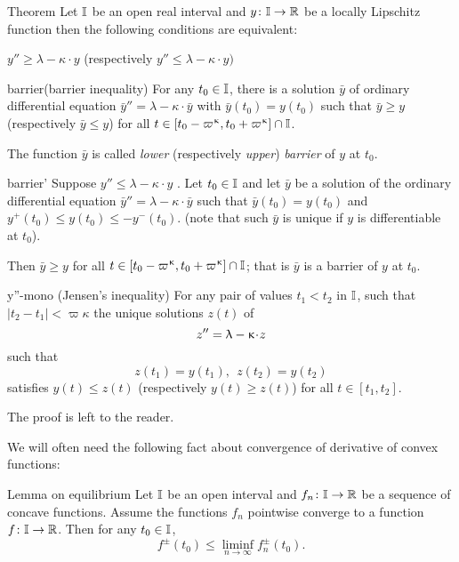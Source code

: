 \begin{thm}{Theorem}\label{y''=<1-ky}
Let $\mathbb{I}$ be an open real interval and $y\:\II\to\RR$ be a locally Lipschitz function
then the following conditions are equivalent:
\begin{subthm}{}$y''\ge \lambda-\kappa\cdot  y$ (respectively $y''\le \lambda-\kappa\cdot  y)$
\end{subthm}

\begin{subthm}{barrier}(barrier inequality) For any $t_0\in \II$, 
there is a solution $\bar y$ 
of ordinary differential equation $\bar y''=\lambda-\kappa\cdot  \bar y$ 
with $\bar y(t_0)= y(t_0)$ such that $\bar y\ge y$ (respectively $\bar y\le y$) for all $t\in [t_0-\varpi\kappa,t_0+\varpi\kappa]\cap \II$.

The function $\bar y$ is called \emph{lower} (respectively \emph{upper}) \emph{barrier} of $y$ at $t_0$.
\end{subthm}

\begin{subthm}{barrier'} 
Suppose $y''\le \lambda-\kappa\cdot  y$ . Let $t_0\in\II$ and let  $\bar y$ be a solution of  the
 ordinary differential equation $\bar y''=\lambda-\kappa\cdot  \bar y$ 
such that  $\bar y(t_0)= y(t_0)$ and $y^+(t_0)\le y(t_0)\le -y^-(t_0)$. (note that such $\bar{y}$ is unique if $y$ is differentiable at $t_0$). 

Then $\bar y\ge y$  for all $t\in [t_0-\varpi\kappa,t_0+\varpi\kappa]\cap \II$; that is $\bar{y}$ is a barrier of $y$ at $t_0$.
\end{subthm}

\begin{subthm}{y''-mono} (Jensen's inequality)
For any pair of values $t_1<t_2$ in $\mathbb{I}$, such that $|t_2-t_1|<\varpi\kappa$ the unique solutions $z(t)$ of \[z''\z=\lambda-\kappa\cdot  z\] such that
\[z(t_1)=y(t_1),\ \ z(t_2)=y(t_2)\] 
satisfies $y(t)\le z(t)$ (respectively $y(t)\ge z(t)$) for all $t\in[t_1,t_2]$.
\end{subthm}
\end{thm}

The proof is left to the reader.

We will often need the following fact about convergence of derivative of convex functions:

\begin{thm}{Lemma on equilibrium}\label{lem:der-conv-lim}
Let $\mathbb{I}$ be an open interval 
and $f_n\:\II\to\RR$ be a sequence of concave functions. 
Assume the functions $f_n$ pointwise converge to a function $f\:\II\to\RR$.
Then for any $t_0\in \II$,
\[f^\pm(t_0)\le \liminf_{n\to\infty}f^\pm_n(t_0).\]
\end{thm}

